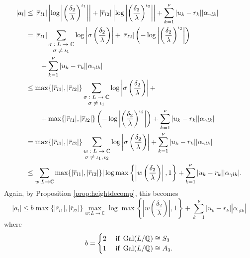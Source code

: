 \begin{align*}
|a_l| 	& \leq |\overline{r}_{l1}|\left|\log\left|\left(\frac{\delta_2}{\lambda}\right)^{\iota_1}\right|\right| + |\overline{r}_{l2}|\left|\log\left|\left(\frac{\delta_2}{\lambda}\right)^{\iota_2}\right|\right| + \sum_{k=1}^{\nu}|u_k-r_k||\alpha_{\gamma l k}|\\
	& = |\overline{r}_{l1}|\sum_{\shortstack{\footnotesize $\sigma: L \to \mathbb{C} $\\ \footnotesize $ \sigma \neq \iota_1$}} \log\left|\sigma \left(\frac{\delta_2}{\lambda}\right)\right|+ |\overline{r}_{l2}|\left(-\log\left|\left(\frac{\delta_2}{\lambda}\right)^{\iota_2}\right|\right) \\
	& \quad \quad + \sum_{k=1}^{\nu}|u_k-r_k||\alpha_{\gamma l k}| \\
	& \leq \max\{|\overline{r}_{l1}|, |\overline{r}_{l2}|\}\sum_{\shortstack{\footnotesize $\sigma: L \to \mathbb{C} $\\ \footnotesize $ \sigma \neq \iota_1$}} \log\left|\sigma \left(\frac{\delta_2}{\lambda}\right)\right| +\\
	& \quad \quad +\max\{|\overline{r}_{l1}|, |\overline{r}_{l2}|\}\left(-\log\left|\left(\frac{\delta_2}{\lambda}\right)^{\iota_2}\right|\right) + \sum_{k=1}^{\nu}|u_k-r_k||\alpha_{\gamma l k}|\\
	& = \max\{|\overline{r}_{l1}|, |\overline{r}_{l2}|\}\sum_{\shortstack{\footnotesize $w: L \to \mathbb{C} $\\ \footnotesize $ \sigma \neq \iota_1, \iota_2$}} \log\left|\sigma \left(\frac{\delta_2}{\lambda}\right)\right|  + \sum_{k=1}^{\nu}|u_k-r_k||\alpha_{\gamma l k}|\\
	&  \leq \sum_{w: L \to \mathbb{C}}\max\{|\overline{r}_{l1}|, |\overline{r}_{l2}|\}|\log\max\left\{\left|w\left(\frac{\delta_2}{\lambda}\right)\right|,1\right\} + \sum_{k=1}^{\nu}|u_k-r_k||\alpha_{\gamma l k}|.
\end{align*}
Again, by Proposition \ref{prop:heightdecomp}, this becomes
\[|a_l| \leq b\max\{|\overline{r}_{l1}|, |\overline{r}_{l2}|\}\max_{w:L\to \mathbb{C}} \log \max \left\{ \left|w\left(\frac{\delta_2}{\lambda}\right)\right|, 1\right\} +  \sum_{k=1}^{\nu}|u_k-r_k||\alpha_{\gamma l k}|\]
where
\[b =
\begin{cases}
2 & \text{ if } \operatorname{Gal}(L/\mathbb{Q}) \cong S_3\\
1 & \text{ if } \operatorname{Gal}(L/\mathbb{Q}) \cong A_3.
\end{cases}\]

